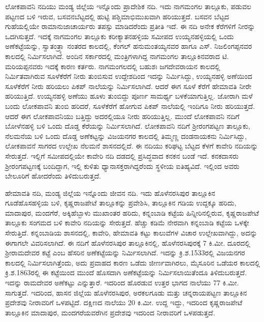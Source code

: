 ಲೋಕಪಾವನಿ ನದಿಯು ಮಂಡ್ಯ ಜಿಲ್ಲೆಯ ಇನ್ನೊಂದು ಪ್ರಾದೇಶಿಕ ನದಿ. ಇದು ನಾಗಮಂಗಲ ತಾಲ್ಲೂಕು, ಪಡುವಲ ಪಟ್ಟಣದ ಬಳಿ ಇರುವ, ಬಸವನಬೆಟ್ಟದಲ್ಲಿ ಹುಟ್ಟಿ ಪಶ್ಚಿಮಾಭಿಮುಖವಾಗಿ ಹರಿಯುತ್ತದೆ. ಬಸವನ ಬೆಟ್ಟದ ಗುಹೆ\-ಯಲ್ಲಿಯೇ ರಾಮಾನುಜಾಚಾರ್ಯರು ತಪಸ್ಸು ಮಾಡಿದರೆಂದು ಪ್ರತೀತಿ ಇದೆ. ಈ ನದಿ ಅನೇಕ ಕೆರೆಗಳಿಗೆ ನೀರನ್ನು ಒದಗಿಸುತ್ತದೆ. ಇದಕ್ಕೆ ನಾಗಮಂಗಲ ತಾಲ್ಲೂಕು ಕರೀಕ್ಯಾತನಹಳ್ಳಿಯ ಸಮೀಪದ ಉಯ್ಯನಹಳ್ಳಿಯಲ್ಲಿ ಒಂದು ಅಣೆಕಟ್ಟೆಯನ್ನು, ಸ್ವಾತಂತ್ರ್ಯಾ ನಂತರದ ಕಾಲದಲ್ಲಿ, ಕೆಂಗಲ್​ ಹನುಮಂತಯ್ಯನವರ ಹಾಗೂ ಎಸ್​. ನಿಜಲಿಂಗಪ್ಪನವರ ಕಾಲದಲ್ಲಿ ನಿರ್ಮಿಸಲಾಗಿದೆ. ಅಂದಿನ ಸರ್ಕಾರದಲ್ಲಿ ಮಂತ್ರಿಗಳಾಗಿದ್ದ ನಾಗಮಂಗಲ ತಾಲ್ಲೂಕಿನವರಾದ ಟಿ. ಮರಿಯಪ್ಪನವರು ಇದಕ್ಕೆ ಕಾರಣ ಕರ್ತರು. ನಾಗಮಂಗಲದಲ್ಲಿ ಬಹುಶಃ ಜಗದೇವರಾಯನ ಕಾಲದಲ್ಲಿ ನಿರ್ಮಿತವಾಗಿರುವ ಸೂಳೆಕೆರೆಗೆ ನೀರು ತುಂಬಿಸುವ ಉದ್ದೇಶದಿಂದ ಇದನ್ನು ನಿರ್ಮಿಸಿದ್ದು, ಉಯ್ಯನಹಳ್ಳಿ ಅಣೆಯಿಂದ ಸೂಳೆಕೆರೆಗೆ ನೀರು ಹರಿಯಲು ಪಿಕಪ್ ನಾಲೆಯನ್ನು ನಿರ್ಮಿಸಲಾಗಿದೆ. ಆದರೆ ಈಗ ಸೂಳೆ ಕೆರೆಗೆ ಹೇಮಾವತಿ ನೀರೇ ಹರಿಯುತ್ತಿದೆ. ಉಯ್ಯನಹಳ್ಳಿ ಅಣೆಯು ಹೂಳು ತುಂಬಿದ್ದು ಪೂರ್ಣ ಸಾಮರ್ಥ್ಯ ಬಳಕೆಯಾಗುತ್ತಿಲ್ಲ. ಜೋರಾಗಿ ಮಳೆ ಬಂದು ಲೋಕಪಾವನಿ ತುಂಬಿ ಹರಿದರೆ, ಸೂಳೆಕೆರೆಗೆ ಹೋಗುವ ಪಿಕಪ್​ ನಾಲೆಯಲ್ಲಿ ಇಂದಿಗೂ ನೀರು ಹರಿಯುತ್ತದೆ. ಆದರೆ ಈಗ ಲೋಕಪಾವನಿಯು ಬತ್ತಿದ್ದು ಅದರಲ್ಲಿಯೂ ನೀರು ಹರಿಯುತ್ತಿಲ್ಲ. ಮುಂದೆ ಲೋಕಪಾವನಿ ನದಿಗೆ ಬೋಳೆನಹಳ್ಳಿ ಬಳಿ ಒಂದು ದೊಡ್ಡ ಕೆರೆಯನ್ನು ನಿರ್ಮಿಸಲಾಗಿದೆ. ಲೋಕಪಾವನಿ ನದಿಗೆ ಶ‍್ರೀರಂಗಪಟ್ಟಣ ತಾಲ್ಲೂಕು, ನೆಲಮನೆಯ ಬಳಿ ಒಂದು ದೊಡ್ಡ ಅಣೆಕಟ್ಟನ್ನು ವಿಜಯನಗರ ಕಾಲದಲ್ಲಿ ತಿಮ್ಮಣ್ಣ ದಂಡನಾಯಕನು ನಿರ್ಮಿಸಿದ್ದು, ಲೋಕಪಾವನೆ ಸಾಗರದ ಉಲ್ಲೇಖ ನೆಲಮನೆ ಶಾಸನದಲ್ಲಿದೆ. ಈ ನದಿಯು ಕರಿಘಟ್ಟ ಬೆಟ್ಟದ ಕೆಳಗೆ ಕಾವೇರಿ ನದಿಯನ್ನು ಸೇರುತ್ತದೆ. ಇಲ್ಲಿಗೆ ಸಮೀಪದಲ್ಲಿಯೇ ಕಾವೇರಿ ನದಿ ದಡದಲ್ಲಿ ಪ್ರಸಿದ್ಧವಾದ ಕನಕನ ಬಂಡೆ ಇದೆ. ಕನಕದಾಸರು ಶ‍್ರೀರಂಗಪಟ್ಟಣಕ್ಕೆ ಬಂದಿದ್ದಾಗ, ಇಲ್ಲಿ ಕುಳಿತು ಧ್ಯಾನಾಸಕ್ತರಾಗಿದ್ದರೆಂದು ಸ್ಥಳೀಯ ಐತಿಹ್ಯವಿದೆ. ಇಲ್ಲಿಂದ ಅವರು ಬೇಲೂರಿಗೆ ಹೋದರೆಂದು ತಿಳಿದುಬರುತ್ತದೆ.

ಹೇಮಾವತಿ ನದಿ, ಮಂಡ್ಯ ಜಿಲ್ಲೆಯ ಇನ್ನೊಂದು ಜೀವನ ನದಿ. ಇದು ಹೊಳೆನರಸಿಪುರ ತಾಲ್ಲೂಕಿನ ಗೂಡೆ\break ಹೊಸಹಳ್ಳಿಯ ಬಳಿ, ಕೃಷ್ಣರಾಜಪೇಟೆ ತಾಲ್ಲೂಕನ್ನು ಪ್ರವೇಶಿಸಿ, ತಾಲ್ಲೂಕಿನ ಗಡಿಯ ಉದ್ದಕ್ಕೂ ಹರಿದು, ಮಾದಾಪುರ, ಮಂದಗೆರೆ, ಅಕ್ಕಿಹೆಬ್ಬಾಳು ಮುಖಾಂತರ ಹರಿದು, ಕನ್ನಂಬಾಡಿ ಕಟ್ಟೆಯ ಹಿನ್ನೀರಿನಲ್ಲಿರುವ, ಕೃಷ್ಣರಾಜಪೇಟೆ ತಾಲ್ಲೂಕು ಸಂಗಮದ ಬಳಿ ಕಾವೇರಿ ನದಿಯನ್ನು ಸೇರುತ್ತದೆ. ಹೆಚ್ಚು ಕಡಿಮೆ ನೇರವಾಗಿ ಕನ್ನಂಬಾಡಿ ಕಟ್ಟೆಯ ಒಳಕ್ಕೇ ಸೇರುತ್ತಿದೆ. ಕನ್ನಂಬಾಡಿಯ ಶಾಸನದಲ್ಲಿ, ಕಾವೇರಿ, ಹೇಮಾವತಿ ಕಟ್ಟು ಕಾಲುವೆಗಳ ವಿಚಾರ ಉಲ್ಲೇಖವಾಗಿದ್ದು, ಅದನ್ನು ಈಗಾಗಲೇ ವಿವರಿಸಲಾಗಿದೆ. ಈ ನದಿಗೆ ಹೊಳೆನರಸಿಪುರ ತಾಲ್ಲೂಕಿನಲ್ಲಿ, ಹೊಳೆನರಸಿಪುರಕ್ಕೆ 7 ಕಿ.ಮೀ. ದೂರದಲ್ಲಿ ಶ‍್ರೀರಾಮದೇವರ ಕಟ್ಟೆ ಎಂಬ ಹೆಸರಿನ ಅಣೆಕಟ್ಟೆಯನ್ನು ನಿರ್ಮಿಸಲಾಗಿದೆ. ಇದನ್ನು ಕ್ರಿ.ಶ.1533ರಲ್ಲಿ ವಿಜಯನಗರ ಕಾಲದಲ್ಲಿ ನಿರ್ಮಿಸಲಾಗಿತ್ತೆಂದು, ಅದು ಪ್ರವಾಹದ ಕಾರಣ ಒಡೆದು ಜೀರ್ಣವಾಗಿರಲು, ಮೈಸೂರಿನ ಒಡೆಯರ ಕಾಲದಲ್ಲಿ ಕ್ರಿ.ಶ.1863ರಲ್ಲಿ ಈ ಕಟ್ಟೆಯಿಂದ ಮುಂದೆ ಹೊಸದಾಗಿ ಅಣೆಕಟ್ಟೆಯನ್ನು ನಿರ್ಮಿಸಲಾಯಿತೆಂದೂ ತಿಳಿದುಬರುತ್ತದೆ. ಇದನ್ನು ರಾಮದೇವರ ಅಣೆಕಟ್ಟು ಎನ್ನುತ್ತಾರೆ. ಇದರಿಂದ ಹೊರಡುವ ಉತ್ತರ ಭಾಗದ ನಾಲೆಯು 77 ಕಿ.ಮೀ. ಸಾಗುತ್ತದೆ. ಇದರಿಂದ, ಹಾಸನ ಜಿಲ್ಲೆಯ ಹೊಳೆನರಸಿಪುರ, ಅರಕಲಗೂಡು ಮತ್ತು ಚನ್ನರಾಯಪಟ್ಟಣ ತಾಲ್ಲೂಕಿನ ಪ್ರದೇಶವು ನೀರಾವರಿಗೆ ಒಳಪಟ್ಟಿದೆ. ದಕ್ಷಿಣದ ನಾಲೆಯು 20 ಕಿ.ಮೀ. ಉದ್ದ ಇದ್ದು, ಇದರಿಂದ ಕೃಷ್ಣರಾಜಪೇಟೆ ತಾಲ್ಲೂಕಿನ ಮಾದಾಪುರ, ಮಂದಗರೆಯವರೆಗಿನ ಪ್ರದೇಶವು ಇದರಿಂದ ನೀರಾವರಿಗೆ ಒಳಪಡುತ್ತದೆ.

